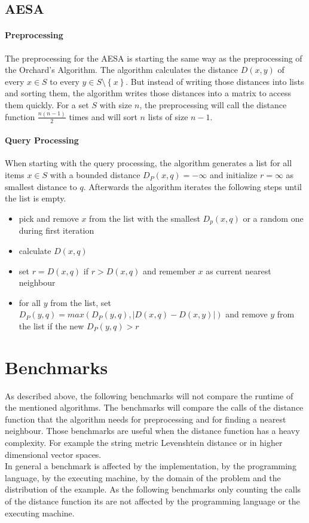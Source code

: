 \documentclass[runningheads,a4paper]{llncs}
\begin{document}
\subsection{AESA}

\paragraph{Preprocessing}

The preprocessing for the AESA is starting the same way as the preprocessing of the Orchard’s Algorithm. The algorithm
calculates the distance $D(x, y)$ of every $x \in S$ to every $y \in S\setminus\left\{ {x}\right\}$. But instead of
writing those distances into lists and sorting them, the algorithm writes those distances into a matrix to access them
quickly. For a set $S$ with size $n$, the preprocessing will call the distance function $\frac{n(n-1)}{2}$ times and
will sort $n$ lists of size $n-1$.

\paragraph{Query Processing}

When starting with the query processing, the algorithm generates a list for all items $x \in S$ with a bounded
distance $D_P(x, q) = -\infty$ and initialize $r = \infty$ as smallest distance to $q$. Afterwards the algorithm
iterates the following steps until the list is empty.
\begin{itemize}
	\item pick and remove $x$ from the list with the smallest $D_p(x, q)$ or a random one during first iteration
	\item calculate $D(x, q)$
	\item set $r = D(x, q)$ if $r > D(x, q)$ and remember $x$ as current nearest neighbour
	\item for all $y$ from the list, set $D_P(y, q) = max(D_P(y, q), |D(x, q) - D(x, y)|)$ and remove $y$ from the list
		if the new $D_P(y, q) > r$
\end{itemize}

\section{Benchmarks}

As described above, the following benchmarks will not compare the runtime of the mentioned algorithms. The benchmarks
will compare the calls of the distance function that the algorithm needs for preprocessing and for finding a nearest
neighbour. Those benchmarks are useful when the distance function has a heavy complexity. For example the string
metric Levenshtein distance or in higher dimensional vector spaces.\\
In general a benchmark is affected by the implementation, by the programming language, by the executing machine, by the
domain of the problem and the distribution of the example. As the following benchmarks only counting the calls of the
distance function its are not affected by the programming language or the executing machine.
\end{document}
